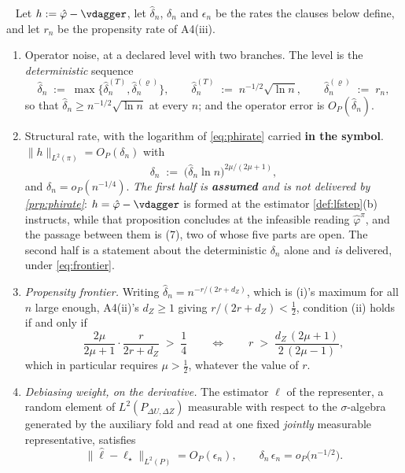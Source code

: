 \begin{assumption}\label{ass:rates}~
Let $h:=\hat\varphi-\vdagger$, let $\hat\delta_n$, $\delta_n$ and $\epsilon_n$ be the rates the clauses
below define, and let $r_n$ be the propensity rate of A4(iii).
\begin{enumerate}
\item[(i)] Operator noise, at a declared level with two branches. The level is the
\emph{deterministic} sequence
\[
\hat\delta_n\;:=\;\max\big\{\hat\delta_n^{(T)},\hat\delta_n^{(\varrho)}\big\},
\qquad
\hat\delta_n^{(T)}\;:=\;n^{-1/2}\sqrt{\ln n},
\qquad
\hat\delta_n^{(\varrho)}\;:=\;r_n ,
\]
so that $\hat\delta_n\ge n^{-1/2}\sqrt{\ln n}$ at every $n$; and the operator error is
$O_P(\hat\delta_n)$.
\item[(ii)] Structural rate, with the logarithm of \eqref{eq:phirate} carried \textbf{in the
symbol}. $\|h\|_{L^2(\pi)}=O_P(\delta_n)$ with
\[
\delta_n\;:=\;\big(\hat\delta_n\ln n\big)^{2\mu/(2\mu+1)} ,
\]
and $\delta_n=o_P(n^{-1/4})$. \emph{The first half is \textbf{assumed} and is not delivered by
\cref{prp:phirate}}: $h=\hat\varphi-\vdagger$ is formed at the estimator \cref{def:lfstep}\textup{(b)}
instructs, while that proposition concludes at the infeasible reading $\hat\varphi^{\pi}$, and the
passage between them is \textup{(7)}, two of whose five parts are open. The
second half is a statement about the deterministic $\delta_n$ alone and \emph{is} delivered, under
\eqref{eq:frontier}.
\item[(iii)] \emph{Propensity frontier.} Writing $\hat\delta_n=n^{-r/(2r+d_Z)}$, which is
\textup{(i)}'s maximum for all $n$ large enough, A4(ii)'s $d_Z\ge1$ giving $r/(2r+d_Z)<\tfrac12$, 
condition (ii) holds if and only if
\begin{equation}\label{eq:frontier}
\frac{2\mu}{2\mu+1}\cdot\frac{r}{2r+d_Z}\;>\;\frac14
\qquad\Longleftrightarrow\qquad
r\;>\;\frac{d_Z\,(2\mu+1)}{2\,(2\mu-1)},
\end{equation}
which in particular requires $\mu>\tfrac12$, whatever the value of $r$.
\item[(iv)] \emph{Debiasing weight, on the derivative.} The estimator $\hat\ell$ of the representer, a
random element of $L^{2}(P_{\Delta U,\Delta Z})$ measurable with respect to the $\sigma$-algebra generated
by the auxiliary fold and read at one fixed \emph{jointly} measurable representative, satisfies
\[
\big\|\hat\ell-\ell_\star\big\|_{L^{2}(P)}=O_P(\epsilon_n),
\qquad \delta_n\,\epsilon_n=o_P\big(n^{-1/2}\big).
\]

\end{enumerate}
\end{assumption}
